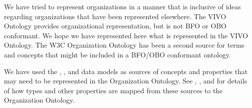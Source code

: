 \documentclass[letterpaper,10pt,english]{sphinxmanual}
\begin{document}
\sphinxAtStartPar
We have tried to represent organizations in a manner that is inclusive of ideas
regarding organizations that have been represented elsewhere.  The VIVO
Ontology 
provides organizational representation, but is not BFO or OBO conformant.  We
hope we have represented here what is represented in the VIVO Ontology.  The W3C
Organization Ontology  has been a second source for terms and
concepts that might be included in a BFO/OBO conformant ontology.

\sphinxAtStartPar
We have used the , , and  data models as sources of
concepts and properties that may need to be represented in the Organization
Ontology.  See {\hyperref[\detokenize{vivo-to-org::doc}]{}}, {\hyperref[\detokenize{ror-to-org::doc}]{}}, and {\hyperref[\detokenize{schema-to-org::doc}]{}} for
details of how
types and other properties are mapped from these sources to the Organization Ontology.
\end{document}
